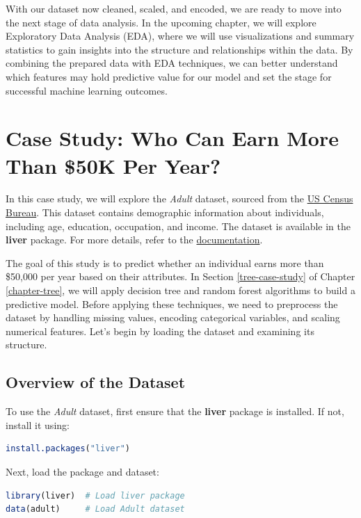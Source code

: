 \documentclass[
]{book}
\theoremstyle{definition}
\theoremstyle{definition}
\theoremstyle{definition}
\theoremstyle{definition}
\theoremstyle{remark}
\begin{document}
With our dataset now cleaned, scaled, and encoded, we are ready to move into the next stage of data analysis. In the upcoming chapter, we will explore Exploratory Data Analysis (EDA), where we will use visualizations and summary statistics to gain insights into the structure and relationships within the data. By combining the prepared data with EDA techniques, we can better understand which features may hold predictive value for our model and set the stage for successful machine learning outcomes.

\section{Case Study: Who Can Earn More Than \$50K Per Year?}\label{Data-pre-adult}

In this case study, we will explore the \emph{Adult} dataset, sourced from the \href{https://www.census.gov}{US Census Bureau}. This dataset contains demographic information about individuals, including age, education, occupation, and income. The dataset is available in the \textbf{liver} package. For more details, refer to the \href{https://www.rdocumentation.org/packages/liver/versions/1.3/topics/adult}{documentation}.

The goal of this study is to predict whether an individual earns more than \$50,000 per year based on their attributes. In Section \ref{tree-case-study} of Chapter \ref{chapter-tree}, we will apply decision tree and random forest algorithms to build a predictive model. Before applying these techniques, we need to preprocess the dataset by handling missing values, encoding categorical variables, and scaling numerical features. Let's begin by loading the dataset and examining its structure.

\subsection*{Overview of the Dataset}\label{overview-of-the-dataset}

To use the \emph{Adult} dataset, first ensure that the \textbf{liver} package is installed. If not, install it using:

\begin{lstlisting}[language=R]
install.packages("liver")
\end{lstlisting}

Next, load the package and dataset:

\begin{lstlisting}[language=R]
library(liver)  # Load liver package
data(adult)     # Load Adult dataset
\end{lstlisting}
\end{document}
